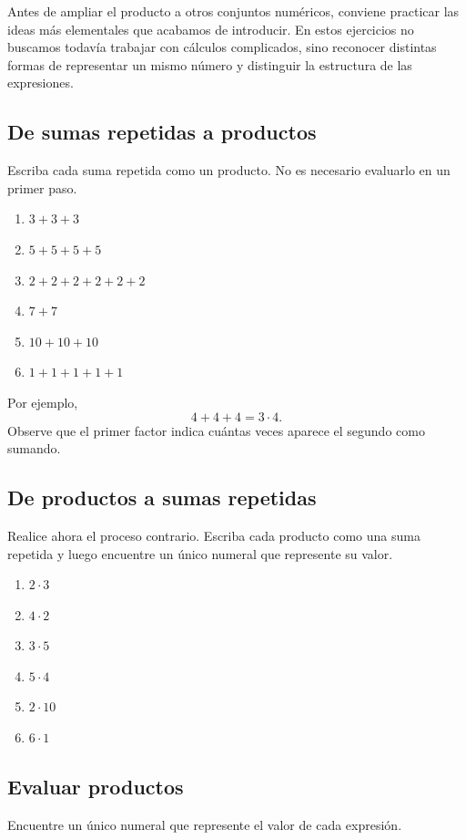Antes de ampliar el producto a otros conjuntos numéricos, conviene practicar las ideas más elementales que acabamos de introducir. En estos ejercicios no buscamos todavía trabajar con cálculos complicados, sino reconocer distintas formas de representar un mismo número y distinguir la estructura de las expresiones.

\subsection*{De sumas repetidas a productos}

Escriba cada suma repetida como un producto. No es necesario evaluarlo en un primer paso.

\begin{enumerate}
\item \(3+3+3\)
\item \(5+5+5+5\)
\item \(2+2+2+2+2+2\)
\item \(7+7\)
\item \(10+10+10\)
\item \(1+1+1+1+1\)
\end{enumerate}

Por ejemplo,
\[
4+4+4=3\cdot4.
\]
Observe que el primer factor indica cuántas veces aparece el segundo como sumando.

\subsection*{De productos a sumas repetidas}

Realice ahora el proceso contrario. Escriba cada producto como una suma repetida y luego encuentre un único numeral que represente su valor.

\begin{enumerate}
\item \(2\cdot3\)
\item \(4\cdot2\)
\item \(3\cdot5\)
\item \(5\cdot4\)
\item \(2\cdot10\)
\item \(6\cdot1\)
\end{enumerate}

\subsection*{Evaluar productos}

Encuentre un único numeral que represente el valor de cada expresión.

